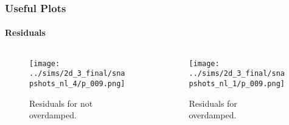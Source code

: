 \documentclass[dvipsnames]{beamer}
\begin{document}
\begin{frame}
    \frametitle{Useful Plots}
    \framesubtitle{Residuals}

    \begin{columns}
        \begin{column}{0.5\textwidth}
            \begin{figure}[t]
                \centering
                \texttt{[image: ../sims/2d\_3\_final/snapshots\_nl\_4/p\_009.png]}
                \caption{Residuals for not overdamped. }
            \end{figure}
        \end{column}
        \begin{column}{0.5\textwidth}
            \begin{figure}[t]
                \centering
                \texttt{[image: ../sims/2d\_3\_final/snapshots\_nl\_1/p\_009.png]}
                \caption{Residuals for overdamped.}
            \end{figure}
        \end{column}
    \end{columns}
\end{frame}
\end{document}

